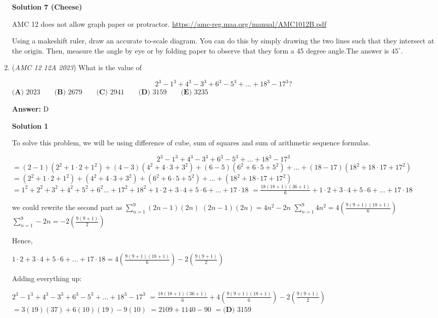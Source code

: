 \begin{enumerate}
 



\textbf{Solution 7 (Cheese)}

AMC 12 does not allow graph paper or protractor. \href{https://amc-reg.maa.org/manual/AMC1012B.pdf}{https://amc-reg.maa.org/manual/AMC1012B.pdf}

 Using a makeshift ruler, draw an accurate to-scale diagram. You can do this by simply drawing the two lines such that they intersect at the origin. Then, measure the angle by eye or by folding paper to observe that they form a 45 degree angle.The answer is $\boxed{45^\circ}$.

 


 


	\item (\textit{AMC 12 12A 2023}) What is the value of

 \[2^3 - 1^3 + 4^3 - 3^3 + 6^3 - 5^3 + \dots + 18^3 - 17^3?\]
$\textbf{(A) } 2023 \qquad\textbf{(B) } 2679 \qquad\textbf{(C) } 2941 \qquad\textbf{(D) } 3159 \qquad\textbf{(E) } 3235$

 \textbf{Answer: }D



\textbf{Solution 1}

To solve this problem, we will be using difference of cube, sum of squares and sum of arithmetic sequence formulas.

 
 \[2^3-1^3+4^3-3^3+6^3-5^3+...+18^3-17^3\]
$=(2-1)(2^2+1 \cdot 2+1^2)+(4-3)(4^2+4 \cdot 3+3^2)+(6-5)(6^2+6 \cdot 5+5^2)+...+(18-17)(18^2+18 \cdot 17+17^2)$
$=(2^2+1 \cdot 2+1^2)+(4^2+4 \cdot 3+3^2)+(6^2+6 \cdot 5+5^2)+...+(18^2+18 \cdot 17+17^2)$
$=1^2+2^2+3^2+4^2+5^2+6^2...+17^2+18^2+1 \cdot 2+3 \cdot 4+5 \cdot 6+...+17 \cdot 18$
$=\frac{18(18+1)(36+1)}{6}+1 \cdot 2+3 \cdot 4+5 \cdot 6+...+17 \cdot 18$

 we could rewrite the second part as $\sum_{n=1}^{9}(2n-1)(2n)$
$(2n-1)(2n)=4n^2-2n$
$\sum_{n=1}^{9}4n^2=4(\frac{9(9+1)(18+1)}{6})$
$\sum_{n=1}^{9}-2n=-2(\frac{9(9+1)}{2})$

 Hence,

 $1 \cdot 2+3 \cdot 4+5 \cdot 6+...+17 \cdot 18 = 4(\frac{9(9+1)(18+1)}{6})-2(\frac{9(9+1)}{2})$

 Adding everything up:

 $2^3-1^3+4^3-3^3+6^3-5^3+...+18^3-17^3$
$=\frac{18(18+1)(36+1)}{6}+4(\frac{9(9+1)(18+1)}{6})-2(\frac{9(9+1)}{2})$
$=3(19)(37)+6(10)(19)-9(10)$
$=2109+1140-90$
$=\boxed{\textbf{(D) } 3159}$





\end{enumerate}
